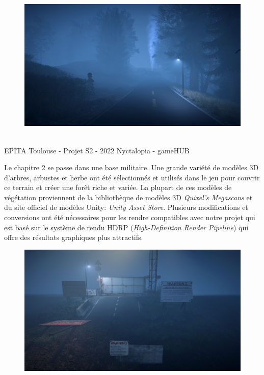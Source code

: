 \begin{figure}[H]
\centering
\begin{minipage}{.5\textwidth}
  \centering
  \centerline{\includegraphics[width=1\linewidth]{img/uwufolder/spawn.png}}
  \label{fig:cinematique}
\end{minipage}%
\end{figure}


\vfill
\noindent\makebox[\linewidth]{\rule{.8\paperwidth}{.6pt}}\\[0.2cm]
EPITA Toulouse - Projet S2 - 2022 \hfill Nyctalopia - gameHUB
\noindent\makebox[\linewidth]{\rule{.8\paperwidth}{.6pt}}
\newpage

Le chapitre 2 se passe dans une base militaire. Une grande variété de modèles 3D d’arbres, arbustes et herbe ont été sélectionnés et utilisés dans le jeu pour couvrir ce terrain et créer une forêt riche et variée. La plupart de ces modèles de végétation proviennent de la bibliothèque de modèles 3D \emph{Quixel’s Megascans} et du site officiel de modèles Unity: \emph{Unity Asset Store}. Plusieurs modifications et conversions ont été nécessaires pour les rendre compatibles avec notre projet qui est basé sur le système de rendu HDRP (\emph{High-Definition Render Pipeline}) qui offre des résultats graphiques plus attractifs.
\newline

\begin{figure}[H]
\centering
\begin{minipage}{.5\textwidth}
  \centering
  \centerline{\includegraphics[width=1\linewidth]{img/uwufolder/military.png}}
  \label{fig:cinematique}
\end{minipage}%
\end{figure}

